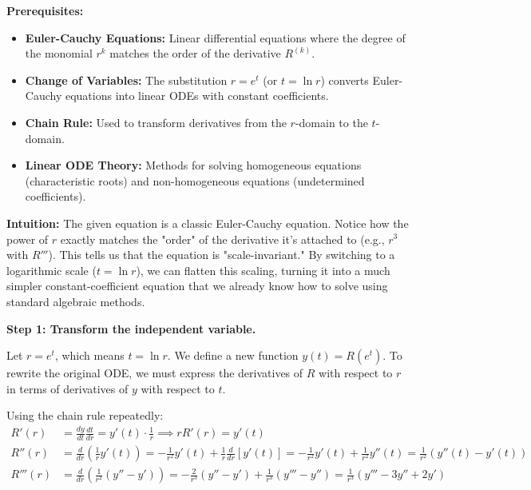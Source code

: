 \begin{solution}
\textbf{Prerequisites:}
\begin{itemize}
    \item \textbf{Euler-Cauchy Equations:} Linear differential equations where the degree of the monomial $r^k$ matches the order of the derivative $R^{(k)}$.
    \item \textbf{Change of Variables:} The substitution $r = e^t$ (or $t = \ln r$) converts Euler-Cauchy equations into linear ODEs with constant coefficients.
    \item \textbf{Chain Rule:} Used to transform derivatives from the $r$-domain to the $t$-domain.
    \item \textbf{Linear ODE Theory:} Methods for solving homogeneous equations (characteristic roots) and non-homogeneous equations (undetermined coefficients).
\end{itemize}

\bigskip

\textbf{Intuition:}
The given equation is a classic Euler-Cauchy equation. Notice how the power of $r$ exactly matches the "order" of the derivative it's attached to (e.g., $r^3$ with $R'''$). This tells us that the equation is "scale-invariant." By switching to a logarithmic scale ($t = \ln r$), we can flatten this scaling, turning it into a much simpler constant-coefficient equation that we already know how to solve using standard algebraic methods.

\bigskip

\textbf{Step 1: Transform the independent variable.}
\par
Let $r = e^t$, which means $t = \ln r$. We define a new function $y(t) = R(e^t)$. To rewrite the original ODE, we must express the derivatives of $R$ with respect to $r$ in terms of derivatives of $y$ with respect to $t$.

\par\bigskip
Using the chain rule repeatedly:
\begin{align*}
R'(r) &= \frac{dy}{dt} \frac{dt}{dr} = y'(t) \cdot \frac{1}{r} \implies rR'(r) = y'(t) \\
R''(r) &= \frac{d}{dr} \left( \frac{1}{r} y'(t) \right) = -\frac{1}{r^2} y'(t) + \frac{1}{r} \frac{d}{dr}[y'(t)] = -\frac{1}{r^2} y'(t) + \frac{1}{r^2} y''(t) = \frac{1}{r^2} (y''(t) - y'(t)) \\
R'''(r) &= \frac{d}{dr} \left( \frac{1}{r^2} (y'' - y') \right) = -\frac{2}{r^3}(y'' - y') + \frac{1}{r^3}(y''' - y'') = \frac{1}{r^3}(y''' - 3y'' + 2y')
\end{align*}


\end{solution}
